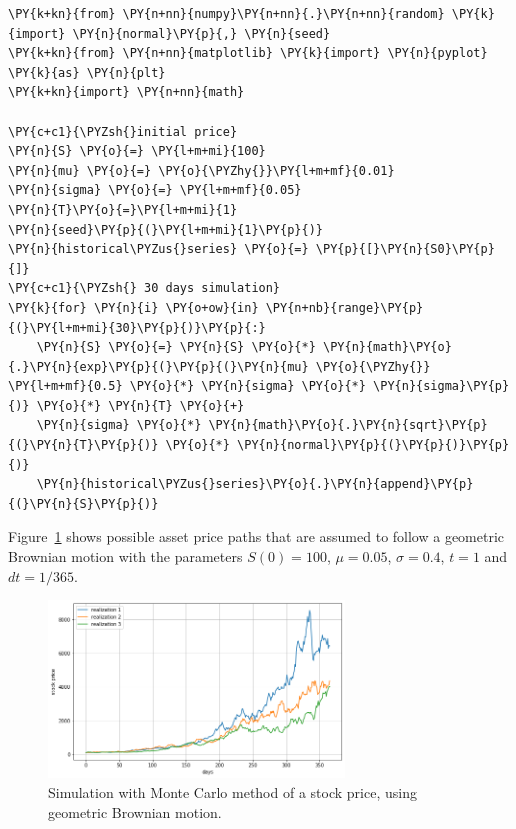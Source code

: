 \begin{tcolorbox}[breakable, size=fbox, boxrule=1pt, pad at break*=1mm,colback=cellbackground, colframe=cellborder]
\begin{Verbatim}[commandchars=\\\{\}]
\PY{k+kn}{from} \PY{n+nn}{numpy}\PY{n+nn}{.}\PY{n+nn}{random} \PY{k}{import} \PY{n}{normal}\PY{p}{,} \PY{n}{seed} 
\PY{k+kn}{from} \PY{n+nn}{matplotlib} \PY{k}{import} \PY{n}{pyplot} \PY{k}{as} \PY{n}{plt} 
\PY{k+kn}{import} \PY{n+nn}{math}
	
\PY{c+c1}{\PYZsh{}initial price}
\PY{n}{S} \PY{o}{=} \PY{l+m+mi}{100}
\PY{n}{mu} \PY{o}{=} \PY{o}{\PYZhy{}}\PY{l+m+mf}{0.01} 
\PY{n}{sigma} \PY{o}{=} \PY{l+m+mf}{0.05} 
\PY{n}{T}\PY{o}{=}\PY{l+m+mi}{1}
\PY{n}{seed}\PY{p}{(}\PY{l+m+mi}{1}\PY{p}{)} 
\PY{n}{historical\PYZus{}series} \PY{o}{=} \PY{p}{[}\PY{n}{S0}\PY{p}{]}
\PY{c+c1}{\PYZsh{} 30 days simulation}
\PY{k}{for} \PY{n}{i} \PY{o+ow}{in} \PY{n+nb}{range}\PY{p}{(}\PY{l+m+mi}{30}\PY{p}{)}\PY{p}{:}
    \PY{n}{S} \PY{o}{=} \PY{n}{S} \PY{o}{*} \PY{n}{math}\PY{o}{.}\PY{n}{exp}\PY{p}{(}\PY{p}{(}\PY{n}{mu} \PY{o}{\PYZhy{}} \PY{l+m+mf}{0.5} \PY{o}{*} \PY{n}{sigma} \PY{o}{*} \PY{n}{sigma}\PY{p}{)} \PY{o}{*} \PY{n}{T} \PY{o}{+}
	\PY{n}{sigma} \PY{o}{*} \PY{n}{math}\PY{o}{.}\PY{n}{sqrt}\PY{p}{(}\PY{n}{T}\PY{p}{)} \PY{o}{*} \PY{n}{normal}\PY{p}{(}\PY{p}{)}\PY{p}{)}
	\PY{n}{historical\PYZus{}series}\PY{o}{.}\PY{n}{append}\PY{p}{(}\PY{n}{S}\PY{p}{)}
\end{Verbatim}
\end{tcolorbox}
Figure~\ref{fig:stock_price_sim} shows possible asset price paths that are assumed to
follow a geometric Brownian motion with the parameters $S(0) = 100$, $\mu =
0.05$, $\sigma = 0.4$, $t = 1$ and $dt = 1/365$. 

\begin{figure}[b]
	\centering
	\includegraphics[width=0.7\textwidth]{figures/asset_price_simulation.png}
	\caption{Simulation with Monte Carlo method of a stock price, using geometric Brownian motion.}
	\label{fig:stock_price_sim}
\end{figure}

